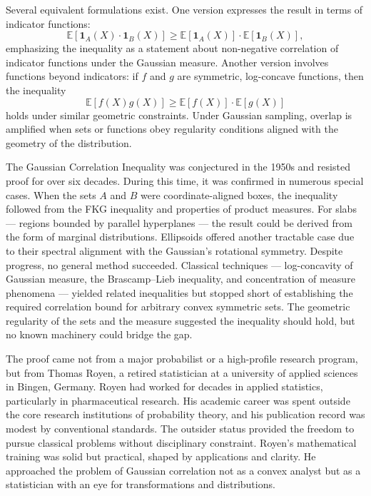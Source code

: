 Several equivalent formulations exist. One version expresses the result in terms of indicator functions:
\[
\mathbb{E}[\mathbf{1}_A(X) \cdot \mathbf{1}_B(X)] \geq \mathbb{E}[\mathbf{1}_A(X)] \cdot \mathbb{E}[\mathbf{1}_B(X)],
\]
emphasizing the inequality as a statement about non-negative correlation of indicator functions under the Gaussian measure. Another version involves functions beyond indicators: if \( f \) and \( g \) are symmetric, log-concave functions, then the inequality
\[
\mathbb{E}[f(X)g(X)] \geq \mathbb{E}[f(X)] \cdot \mathbb{E}[g(X)]
\]
holds under similar geometric constraints. Under Gaussian sampling, overlap is amplified when sets or functions obey regularity conditions aligned with the geometry of the distribution.

The Gaussian Correlation Inequality was conjectured in the 1950s and resisted proof for over six decades. During this time, it was confirmed in numerous special cases. When the sets \( A \) and \( B \) were coordinate-aligned boxes, the inequality followed from the FKG inequality and properties of product measures. For slabs — regions bounded by parallel hyperplanes — the result could be derived from the form of marginal distributions. Ellipsoids offered another tractable case due to their spectral alignment with the Gaussian's rotational symmetry. Despite progress, no general method succeeded. Classical techniques — log-concavity of Gaussian measure, the Brascamp–Lieb inequality, and concentration of measure phenomena — yielded related inequalities but stopped short of establishing the required correlation bound for arbitrary convex symmetric sets. The geometric regularity of the sets and the measure suggested the inequality should hold, but no known machinery could bridge the gap.

The proof came not from a major probabilist or a high-profile research program, but from Thomas Royen, a retired statistician at a university of applied sciences in Bingen, Germany. Royen had worked for decades in applied statistics, particularly in pharmaceutical research. His academic career was spent outside the core research institutions of probability theory, and his publication record was modest by conventional standards. The outsider status provided the freedom to pursue classical problems without disciplinary constraint. Royen's mathematical training was solid but practical, shaped by applications and clarity. He approached the problem of Gaussian correlation not as a convex analyst but as a statistician with an eye for transformations and distributions.

